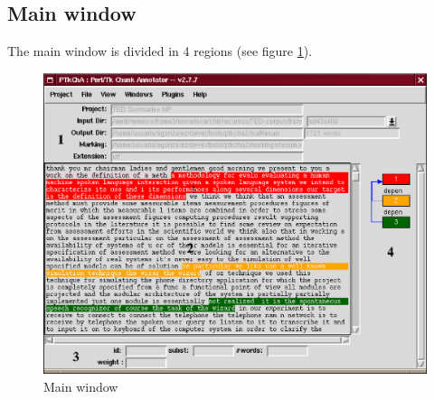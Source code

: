 \documentclass{article}
\begin{document}
\subsection{Main window}
\label{sec:main}

The main window is divided in 4 regions (see figure
\ref{fig:screen}).

\begin{figure}[ht]
\begin{center}

\includegraphics[width=140mm]{img/screen2-annot.eps}

\caption{Main window}
\label{fig:screen}
\end{center}
\end{figure}
\end{document}
